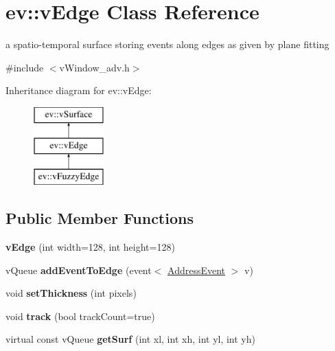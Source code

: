 \hypertarget{classev_1_1vEdge}{}\section{ev\+:\+:v\+Edge Class Reference}
\label{classev_1_1vEdge}


a spatio-\/temporal surface storing events along edges as given by plane fitting  




{\ttfamily \#include $<$v\+Window\+\_\+adv.\+h$>$}

Inheritance diagram for ev\+:\+:v\+Edge\+:\begin{figure}[H]
\begin{center}
\leavevmode
\includegraphics[height=3.000000cm]{classev_1_1vEdge}
\end{center}
\end{figure}
\subsection*{Public Member Functions}
\begin{DoxyCompactItemize}
\item 
{\bfseries v\+Edge} (int width=128, int height=128)\hypertarget{classev_1_1vEdge_a3bbccb1784adbb0543a22e6e1a805be5}{}\label{classev_1_1vEdge_a3bbccb1784adbb0543a22e6e1a805be5}

\item 
v\+Queue {\bfseries add\+Event\+To\+Edge} (event$<$ \hyperlink{classev_1_1AddressEvent}{Address\+Event} $>$ v)\hypertarget{classev_1_1vEdge_a04bc02981fe09b9cc0615a471a4d1594}{}\label{classev_1_1vEdge_a04bc02981fe09b9cc0615a471a4d1594}

\item 
void {\bfseries set\+Thickness} (int pixels)\hypertarget{classev_1_1vEdge_a8add033e36c36c4145d932d8e210750a}{}\label{classev_1_1vEdge_a8add033e36c36c4145d932d8e210750a}

\item 
void {\bfseries track} (bool track\+Count=true)\hypertarget{classev_1_1vEdge_a7e0dd1c7f362d79a0cef3298caa74f8a}{}\label{classev_1_1vEdge_a7e0dd1c7f362d79a0cef3298caa74f8a}

\item 
virtual const v\+Queue {\bfseries get\+Surf} (int xl, int xh, int yl, int yh)\hypertarget{classev_1_1vEdge_a569d6c449ae172b608c0049e9e391e50}{}\label{classev_1_1vEdge_a569d6c449ae172b608c0049e9e391e50}

\end{DoxyCompactItemize}
